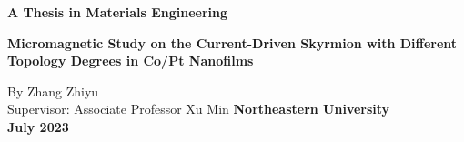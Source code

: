 {\raggedright {} \textbf{A Thesis in Materials Engineering}}
\vfill
\begin{center}
    {\linespread{1.5} \selectfont {} \textbf{
    Micromagnetic Study on the Current-Driven Skyrmion with Different Topology Degrees in Co/Pt Nanofilms}\par}
    \vfill
    {By Zhang Zhiyu\\[3em]
    Supervisor: Associate Professor Xu Min}
    \vfill
    {\textbf{Northeastern University}}
    \\[1em]
    { \textbf{July 2023}}
\end{center}
\newpage
\quad
\newpage
